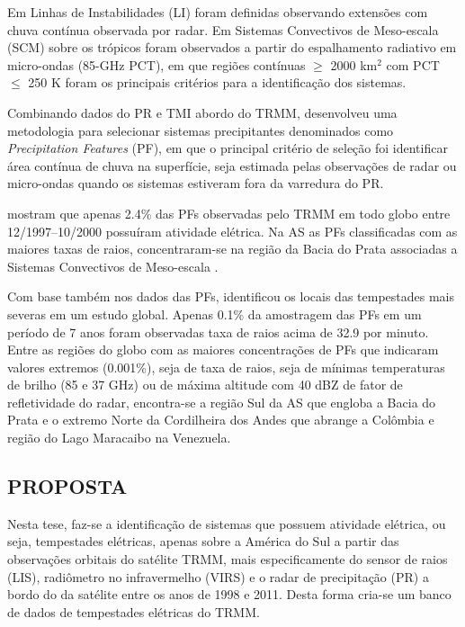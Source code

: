 Em  Linhas de Instabilidades (LI) foram definidas observando extensões com chuva contínua observada por radar. Em  Sistemas Convectivos de Meso-escala (SCM) sobre os trópicos foram observados a partir do espalhamento radiativo em micro-ondas (85-GHz PCT), em que regiões contínuas $\geqslant$ 2000 km$^2$ com PCT $\leqslant$ 250 K foram os principais critérios para a identificação dos sistemas.


Combinando dados do PR e TMI abordo do TRMM,  desenvolveu uma metodologia para selecionar sistemas precipitantes denominados como \textit{Precipitation Features} (PF), em que o principal critério de seleção foi identificar área contínua de chuva na superfície, seja estimada pelas observações de radar ou micro-ondas quando os sistemas estiveram fora da varredura do PR.



 mostram que apenas 2.4\% das PFs observadas pelo TRMM em todo globo entre 12/1997--10/2000 possuíram atividade elétrica. Na AS as PFs classificadas com as maiores taxas de raios, concentraram-se na região da Bacia do Prata associadas a Sistemas Convectivos de Meso-escala \cite{Velasco1987,Durkee2009}.   


Com base também nos dados das PFs,   identificou os locais das tempestades mais severas em um estudo global. Apenas 0.1\% da amostragem das PFs em um período de 7 anos foram observadas taxa de raios acima de 32.9 por minuto.  Entre as regiões do globo com as maiores concentrações de PFs que indicaram valores extremos (0.001\%), seja de taxa de raios, seja de mínimas temperaturas de brilho (85 e 37 GHz) ou de máxima altitude com 40 dBZ de fator de refletividade do radar, encontra-se a região Sul da AS que engloba a Bacia do Prata e o extremo Norte da Cordilheira dos Andes que abrange a Colômbia e região do Lago Maracaibo na Venezuela. 



\subsection{PROPOSTA}
Nesta tese, faz-se a identificação de sistemas que possuem atividade elétrica, ou seja, tempestades elétricas, apenas sobre a América do Sul  a partir das observações orbitais do satélite TRMM, mais especificamente do sensor de raios (LIS), radiômetro no infravermelho (VIRS) e o radar de precipitação (PR) a bordo do da satélite entre os anos de 1998 e 2011. Desta forma cria-se um banco de dados de tempestades elétricas do TRMM.

